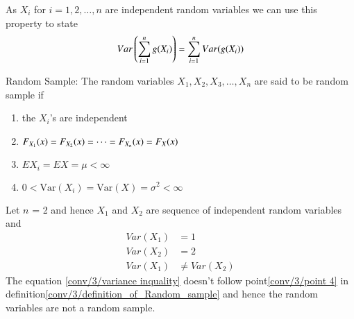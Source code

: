 As $X_{i}$ for $i = 1,2,\dots,n$ are independent random variables we can use this property to state
   \begin{align}
    Var\left(\sum_{i=1}^{n}g(X_{i})\right)=\sum_{i=1}^{n}Var(g(X_{i}))\label{conv/3/basic}
    \end{align}
    \begin{definition}\label{conv/3/definition_of_Random_sample}
     Random Sample: The random variables $X_{1},X_{2},X_{3},\dots,X_{n}$ are said to be random sample if
   \begin{enumerate}
       \item the $X_{i}$'s are independent \label{conv/3/point 1}
       \item $F_{X_{\large{1}}}(x)=F_{X_{\large{2}}}(x)=\dots=F_{X_{\large{n}}}(x)=F_X(x)$ \label{conv/3/point 2}
       \item $EX_i=EX=\mu<\infty$ \label{conv/3/point 3}
       \item$ 0 < \mathrm{Var}(X_i)=\mathrm{Var}(X)=\sigma^2<\infty$ \label{conv/3/point 4}
   \end{enumerate}
    \end{definition}
 
   Let $n$ = 2 and hence $X_{1}$ and $X_{2}$ are sequence of independent random variables and 
   \begin{align}
       Var(X_{1}) &= 1\\
       Var(X_{2}) &= 2\\
       Var(X_{1}) &\neq Var(X_{2}) \label{conv/3/variance inquality} 
   \end{align}
   The equation \eqref{conv/3/variance inquality} doesn't follow point\eqref{conv/3/point 4} in  definition\eqref{conv/3/definition_of_Random_sample} and hence the random variables are not a random sample.
 
